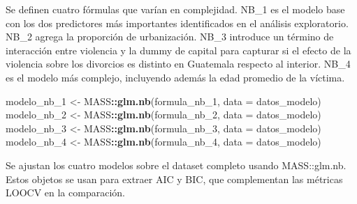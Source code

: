 \documentclass[
]{article}
\newenvironment{Shaded}{\begin{snugshade}}{\end{snugshade}}
\newcommand{\AttributeTok}[1]{\textcolor[rgb]{0.13,0.29,0.53}{#1}}
\newcommand{\FunctionTok}[1]{\textcolor[rgb]{0.13,0.29,0.53}{\textbf{#1}}}
\newcommand{\NormalTok}[1]{#1}
\newcommand{\OtherTok}[1]{\textcolor[rgb]{0.56,0.35,0.01}{#1}}
\newcommand{\SpecialCharTok}[1]{\textcolor[rgb]{0.81,0.36,0.00}{\textbf{#1}}}
\begin{document}
Se definen cuatro fórmulas que varían en complejidad. NB\_1 es el modelo
base con los dos predictores más importantes identificados en el
análisis exploratorio. NB\_2 agrega la proporción de urbanización. NB\_3
introduce un término de interacción entre violencia y la dummy de
capital para capturar si el efecto de la violencia sobre los divorcios
es distinto en Guatemala respecto al interior. NB\_4 es el modelo más
complejo, incluyendo además la edad promedio de la víctima.

\begin{Shaded}
\begin{Highlighting}[]
\NormalTok{modelo\_nb\_1 }\OtherTok{\textless{}{-}}\NormalTok{ MASS}\SpecialCharTok{::}\FunctionTok{glm.nb}\NormalTok{(formula\_nb\_1, }\AttributeTok{data =}\NormalTok{ datos\_modelo)}
\NormalTok{modelo\_nb\_2 }\OtherTok{\textless{}{-}}\NormalTok{ MASS}\SpecialCharTok{::}\FunctionTok{glm.nb}\NormalTok{(formula\_nb\_2, }\AttributeTok{data =}\NormalTok{ datos\_modelo)}
\NormalTok{modelo\_nb\_3 }\OtherTok{\textless{}{-}}\NormalTok{ MASS}\SpecialCharTok{::}\FunctionTok{glm.nb}\NormalTok{(formula\_nb\_3, }\AttributeTok{data =}\NormalTok{ datos\_modelo)}
\NormalTok{modelo\_nb\_4 }\OtherTok{\textless{}{-}}\NormalTok{ MASS}\SpecialCharTok{::}\FunctionTok{glm.nb}\NormalTok{(formula\_nb\_4, }\AttributeTok{data =}\NormalTok{ datos\_modelo)}
\end{Highlighting}
\end{Shaded}

Se ajustan los cuatro modelos sobre el dataset completo usando
MASS::glm.nb. Estos objetos se usan para extraer AIC y BIC, que
complementan las métricas LOOCV en la comparación.

\begin{Shaded}
\end{Shaded}
\end{document}
